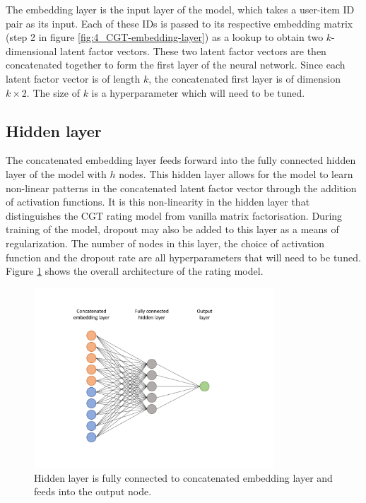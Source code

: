The embedding layer is the input layer of the model, which takes a user-item ID pair as its input. Each of these IDs is passed to its respective embedding matrix (step 2 in figure \ref{fig:4_CGT-embedding-layer}) as a lookup to obtain two $k$-dimensional latent factor vectors. These two latent factor vectors are then concatenated together to form the first layer of the neural network. Since each latent factor vector is of length $k$, the concatenated first layer is of dimension $k\times2$. The size of $k$ is a hyperparameter which will need to be tuned.

\subsection{Hidden layer}
The concatenated embedding layer feeds forward into the fully connected hidden layer of the model with $h$ nodes. This hidden layer allows for the model to learn non-linear patterns in the concatenated latent factor vector through the addition of activation functions. It is this non-linearity in the hidden layer that distinguishes the CGT rating model from vanilla matrix factorisation. During training of the model, dropout may also be added to this layer as a means of regularization. The number of nodes in this layer, the choice of activation function and the dropout rate are all hyperparameters that will need to be tuned. Figure \ref{fig:4_CGT-hidden-layer} shows the overall architecture of the rating model.

\begin{figure}[H]
\centering
\includegraphics[width=0.8\textwidth]{Figures/4_CGT-hidden.pdf}
\decoRule
\caption[Rating model hidden layer]{Hidden layer is fully connected to concatenated embedding layer and feeds into the output node.}
\label{fig:4_CGT-hidden-layer}
\end{figure}

